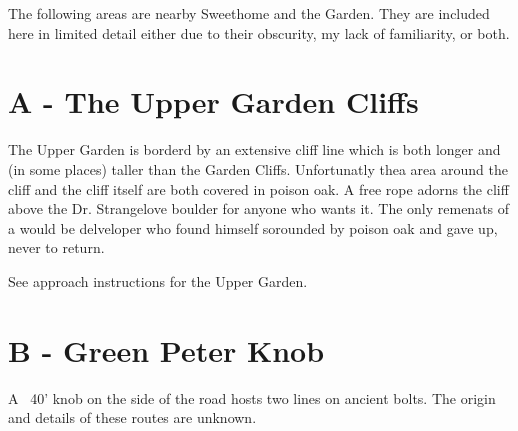 































\raggedcolumns
\begin{multicols}{2}

The following areas are nearby Sweethome and the Garden. They are included here in limited detail either due to their obscurity, my lack of familiarity, or both.\\



\needspace{5cm}

\section{A - The Upper Garden Cliffs}\label{sa:The Upper Garden Cliffs}
The Upper Garden is borderd by an extensive cliff line which is both longer and (in some places) taller than the Garden Cliffs. Unfortunatly thea area around the cliff and the cliff itself are both covered in poison oak. A free rope adorns the cliff above the Dr. Strangelove boulder for anyone who wants it. The only remenats of a would be delveloper who found himself sorounded by poison oak and gave up, never to return.

See approach instructions for the Upper Garden.\\




\needspace{5cm}

\section{B - Green Peter Knob}\label{sa:Green Peter Knob}
A ~40' knob on the side of the road hosts two lines on ancient bolts. The origin and details of these routes are unknown.\\





\end{multicols}
